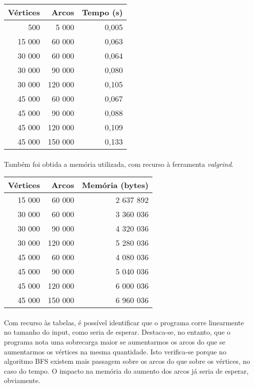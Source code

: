 \documentclass[12pt, a4paper]{article}
\begin{document}
\begin{center}
\begin{tabular}{| r | r | r |}
    \hline
    Vértices & Arcos & Tempo (s)\\
    \hline
    500 & 5 000 & 0,005 \\
    \hline
    15 000 & 60 000& 0,063 \\
    \hline
    30 000 & 60 000 & 0,064 \\
    \hline
    30 000 & 90 000 & 0,080 \\
    \hline
    30 000 & 120 000 & 0,105 \\
    \hline
    45 000 & 60 000 & 0,067 \\
    \hline
    45 000 & 90 000 & 0,088 \\
    \hline
    45 000 & 120 000 & 0,109 \\
    \hline
    45 000 & 150 000 & 0,133 \\
    \hline
\end{tabular}
\end{center}

\paragraph{}
Também foi obtida a memória utilizada, com recurso à ferramenta
\textit{valgrind}.

\begin{center}
\begin{tabular}{| r | r | r |}
    \hline
    Vértices & Arcos & Memória (bytes)\\
    \hline
    15 000 & 60 000 & 2 637 892 \\
    \hline
    30 000 & 60 000 & 3 360 036 \\
    \hline
    30 000 & 90 000 & 4 320 036 \\
    \hline
    30 000 & 120 000 & 5 280 036 \\
    \hline
    45 000 & 60 000 & 4 080 036 \\
    \hline
    45 000 & 90 000 & 5 040 036 \\
    \hline
    45 000 & 120 000 & 6 000 036 \\
    \hline
    45 000 & 150 000 & 6 960 036 \\
    \hline
\end{tabular}
\end{center}

\paragraph{}
Com recurso às tabelas, é possível identificar que o programa corre linearmente
no tamanho do input, como seria de esperar. Destaca-se, no entanto, que o
programa nota uma sobrecarga maior se aumentarmos os arcos do que se aumentarmos
os vértices na mesma quantidade. Isto verifica-se porque no algoritmo BFS
existem mais passagem sobre os arcos do que sobre os vértices, no caso do tempo.
O impacto na memória do aumento dos arcos já seria de esperar, obviamente.
\end{document}
